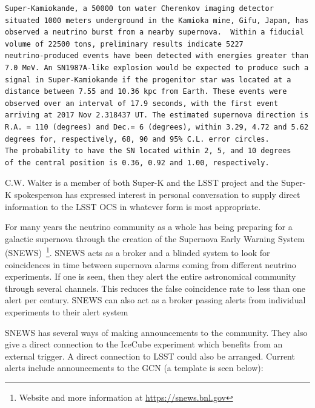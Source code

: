 \documentclass[11pt]{article}
\newcommand{\superk}  {Super\nobreakdash-K\xspace}
\begin{document}
\begin{verbatim}
Super-Kamiokande, a 50000 ton water Cherenkov imaging detector
situated 1000 meters underground in the Kamioka mine, Gifu, Japan, has
observed a neutrino burst from a nearby supernova.  Within a fiducial
volume of 22500 tons, preliminary results indicate 5227
neutrino-produced events have been detected with energies greater than
7.0 MeV. An SN1987A-like explosion would be expected to produce such a
signal in Super-Kamiokande if the progenitor star was located at a
distance between 7.55 and 10.36 kpc from Earth. These events were
observed over an interval of 17.9 seconds, with the first event
arriving at 2017 Nov 2.318437 UT. The estimated supernova direction is
R.A. = 110 (degrees) and Dec.= 6 (degrees), within 3.29, 4.72 and 5.62
degrees for, respectively, 68, 90 and 95% C.L. error circles. 
The probability to have the SN located within 2, 5, and 10 degrees 
of the central position is 0.36, 0.92 and 1.00, respectively.
\end{verbatim}

C.W. Walter is a member of both \superk and the LSST project and
the \superk spokesperson has expressed interest in personal
conversation to supply direct information to the LSST OCS in whatever
form is most appropriate.

For many years the neutrino community as a whole has being preparing
for a galactic supernova through the creation of the Supernova Early
Warning System (SNEWS)~\cite{2004NJPh....6..114A}\footnote{Website and
  more information at \url{https://snews.bnl.gov}}. SNEWS acts as a
broker and a blinded system to look for coincidences in time between
supernova alarms coming from different neutrino experiments. If one is
seen, then they alert the entire astronomical community through several
channels. This reduces the false coincidence rate to less than one
alert per century. SNEWS can also act as a broker passing alerts from
individual experiments to their alert system

SNEWS has several ways of making announcements to the community.  They
also give a direct connection to the IceCube experiment which benefits
from an external trigger.  A direct connection to LSST could also be
arranged.  Current  alerts include announcements to the GCN (a
template is seen below):
\end{document}
